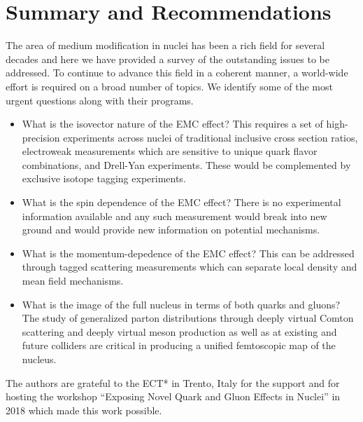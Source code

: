 \section{Summary and Recommendations}

The area of medium modification in nuclei has been a rich field for several decades and here we have provided a survey of the outstanding issues to be addressed.  To continue to advance this field in a coherent manner, a world-wide effort is required on a broad number of topics.  We identify some of the most urgent questions along with their programs.

\begin{itemize}
    \item{What is the isovector nature of the EMC effect?  This requires a set of high-precision experiments across nuclei of traditional inclusive cross section ratios, electroweak measurements which are sensitive to unique quark flavor combinations, and Drell-Yan experiments.  These would be complemented by exclusive isotope tagging experiments.}
    \item{What is the spin dependence of the EMC effect?  There is no experimental information available and any such measurement would break into new ground and would provide new information on potential mechanisms.}
    \item{What is the momentum-depedence of the EMC effect?  This can be addressed through tagged scattering measurements which can separate local density and mean field mechanisms.}
    \item{What is the image of the full nucleus in terms of both quarks and gluons?  The study of generalized parton distributions through deeply virtual Comton scattering and deeply virtual meson production as well as at existing and future colliders are critical in producing a unified femtoscopic map of the nucleus.}
\end{itemize}

The authors are grateful to the ECT* in Trento, Italy for the support and for hosting the workshop ``Exposing Novel Quark and Gluon Effects in Nuclei'' in 2018 which made this work possible.
